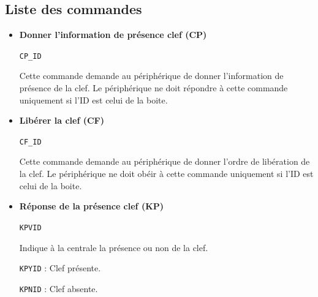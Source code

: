 \documentclass[a4paper, 10pt]{article} %
\newcommand{\saut}{\vspace{0.5cm}}
\begin{document}
\subsection{Liste des commandes}
\begin{itemize}

  \item \textbf{Donner l'information de présence clef (CP)}
    \begin{center}\verb|CP_ID|\end{center}
    Cette commande demande au périphérique de donner l'information de présence de la clef.
    Le périphérique ne doit répondre à cette commande uniquement si l'ID est celui de la boite.

\saut

  \item \textbf{Libérer la clef (CF)}
    \begin{center}\verb|CF_ID|\end{center}
    Cette commande demande au périphérique de donner l'ordre de libération de la clef.
    Le périphérique ne doit obéir à cette commande uniquement si l'ID est celui de la boite.
\saut 

  \item \textbf{Réponse de la présence clef (KP)}
    \begin{center}\verb|KPVID|\end{center}
	Indique à la centrale la présence ou non de la clef.
	
	\verb|KPYID| : Clef présente.
	
	\verb|KPNID| : Clef absente.
\end{itemize}
\end{document}
